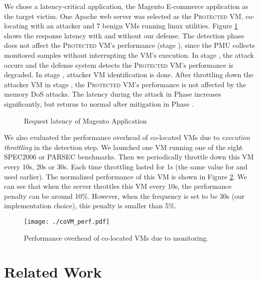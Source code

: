 \documentclass{sig-alternate}
\newcommand{\bheading}[1]{{\vspace{2pt}\noindent{\textbf{#1}}\hspace{2pt}}}
\newcommand{\RNum}[1]{\uppercase\expandafter{\romannumeral #1\relax}}
\newcommand{\attackname}{memory DoS attacks\xspace}
\newcommand{\protectedVM}{\textsc{Protected VM}\xspace}
\begin{document}
\bheading{Latency increase and mitigation.} 
We chose a latency-critical application, the Magento E-commerce application as the 
target victim. One Apache web server was selected as the \protectedVM, co-locating 
with an attacker and 7 benign VMs running linux utilities. Figure
\ref{fig:vm_detect_perf} shows the response latency with and without our defense. 
The detection phase does not affect the \protectedVM's performance 
(stage \RNum{1}), since the PMU collects monitored samples without interrupting 
the VM's execution. In stage \RNum{2}, the attack occurs and the defense system 
detects the \protectedVM's performance is degraded. In stage \RNum{3}, attacker VM 
identification is done. After throttling down the attacker VM in stage \RNum{4}, 
the \protectedVM's performance is not affected by the \attackname. The 
latency during the attack in Phase \RNum{2} increases significantly, but returns 
to normal after mitigation in Phase \RNum{4}.

\begin{figure}[ht]
     \centering
    \caption{Request latency of Magento Application}
    \label{fig:vm_detect_perf}
\end{figure}


We also evaluated the performance overhead of co-located VMs due to \emph{execution
throttling} in the detection step. We launched one VM running one of the eight 
SPEC2006 or PARSEC benchmarks. Then we periodically throttle down this VM every 
10s, 20s or 30s. Each time throttling lasted for 1s (the same value for  and 
 used earlier). The normalized performance of this VM is shown in Figure 
\ref{fig:coVM_perf}. We can see that when the server throttles this VM every 10s, 
the performance penalty can be around 10\%. However, when the frequency is set to 
be 30s (our implementation choice), this penalty is smaller than 5\%. 


\begin{figure}[ht]
\centerline{\mbox{\texttt{[image: ./coVM\_perf.pdf]}}}
\caption{Performance overhead of co-located VMs due to monitoring.}
\label{fig:coVM_perf}
\end{figure}

\section{Related Work}
\label{sec:related}
\end{document}
